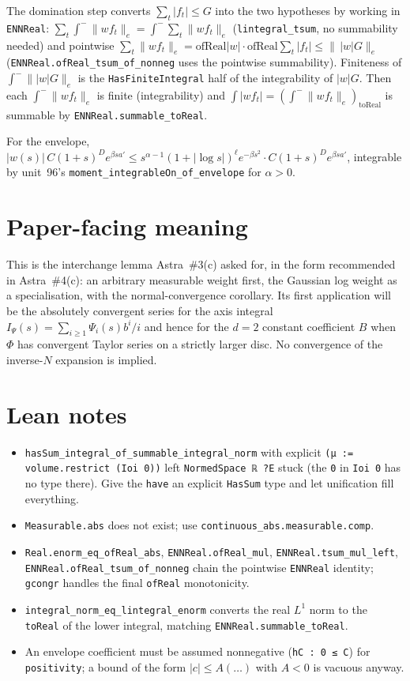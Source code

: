 \documentclass[11pt]{article}
\begin{document}
The domination step converts $\sum_t|f_t|\le G$ into the two hypotheses by working in
\texttt{ENNReal}: $\sum_t\int^-\|wf_t\|_e=\int^-\sum_t\|wf_t\|_e$ (\texttt{lintegral\_tsum}, no
summability needed) and pointwise
$\sum_t\|wf_t\|_e=\mathrm{ofReal}|w|\cdot\mathrm{ofReal}\sum_t|f_t|\le\|\,|w|G\|_e$
(\texttt{ENNReal.ofReal\_tsum\_of\_nonneg} uses the pointwise summability). Finiteness of
$\int^-\||w|G\|_e$ is the \texttt{HasFiniteIntegral} half of the integrability of $|w|G$. Then each
$\int^-\|wf_t\|_e$ is finite (integrability) and
$\int|wf_t|=(\int^-\|wf_t\|_e)_{\mathrm{toReal}}$ is summable by \texttt{ENNReal.summable\_toReal}.

For the envelope, $|w(s)|\,C(1+s)^De^{\beta sa'}\le s^{\alpha-1}(1+|\log s|)^\ell e^{-\beta s^2}
\cdot C(1+s)^De^{\beta sa'}$, integrable by unit~96's
\texttt{moment\_integrableOn\_of\_envelope} for $\alpha>0$.

\section{Paper-facing meaning}

This is the interchange lemma Astra~\#3(c) asked for, in the form recommended in Astra~\#4(c): an
arbitrary measurable weight first, the Gaussian log weight as a specialisation, with the
normal-convergence corollary. Its first application will be the absolutely convergent series for the
axis integral $I_\Psi(s)=\sum_{i\ge1}\Psi_i(s)b^i/i$ and hence for the $d=2$ constant coefficient
$B$ when $\Phi$ has convergent Taylor series on a strictly larger disc. No convergence of the
inverse-$N$ expansion is implied.

\section{Lean notes}

\begin{itemize}
\item \texttt{hasSum\_integral\_of\_summable\_integral\_norm} with explicit
\texttt{(μ := volume.restrict (Ioi 0))} left \texttt{NormedSpace ℝ ?E} stuck (the \texttt{0} in
\texttt{Ioi 0} has no type there). Give the \texttt{have} an explicit \texttt{HasSum} type and
let unification fill everything.
\item \texttt{Measurable.abs} does not exist; use
\texttt{continuous\_abs.measurable.comp}.
\item \texttt{Real.enorm\_eq\_ofReal\_abs}, \texttt{ENNReal.ofReal\_mul},
\texttt{ENNReal.tsum\_mul\_left}, \texttt{ENNReal.ofReal\_tsum\_of\_nonneg} chain the pointwise
\texttt{ENNReal} identity; \texttt{gcongr} handles the final \texttt{ofReal} monotonicity.
\item \texttt{integral\_norm\_eq\_lintegral\_enorm} converts the real $L^1$ norm to the
\texttt{toReal} of the lower integral, matching \texttt{ENNReal.summable\_toReal}.
\item An envelope coefficient must be assumed nonnegative (\texttt{hC : 0 ≤ C}) for
\texttt{positivity}; a bound of the form $|c|\le A(\dots)$ with $A<0$ is vacuous anyway.
\end{itemize}
\end{document}
